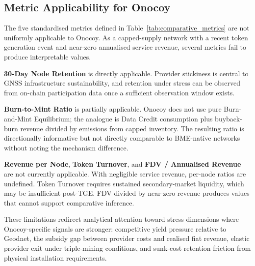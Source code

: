 \subsection{Metric Applicability for Onocoy}
\label{subsec:onocoy_metric_applicability}

The five standardised metrics defined in Table~\ref{tab:comparative_metrics} are not uniformly applicable to Onocoy. As a capped-supply network with a recent token generation event and near-zero annualised service revenue, several metrics fail to produce interpretable values.

\textbf{30-Day Node Retention} is directly applicable. Provider stickiness is central to GNSS infrastructure sustainability, and retention under stress can be observed from on-chain participation data once a sufficient observation window exists.

\textbf{Burn-to-Mint Ratio} is partially applicable. Onocoy does not use pure Burn-and-Mint Equilibrium; the analogue is Data Credit consumption plus buyback-burn revenue divided by emissions from capped inventory. The resulting ratio is directionally informative but not directly comparable to BME-native networks without noting the mechanism difference.

\textbf{Revenue per Node}, \textbf{Token Turnover}, and \textbf{FDV / Annualised Revenue} are not currently applicable. With negligible service revenue, per-node ratios are undefined. Token Turnover requires sustained secondary-market liquidity, which may be insufficient post-TGE. FDV divided by near-zero revenue produces values that cannot support comparative inference.

These limitations redirect analytical attention toward stress dimensions where Onocoy-specific signals are stronger: competitive yield pressure relative to Geodnet, the subsidy gap between provider costs and realised fiat revenue, elastic provider exit under triple-mining conditions, and sunk-cost retention friction from physical installation requirements.
